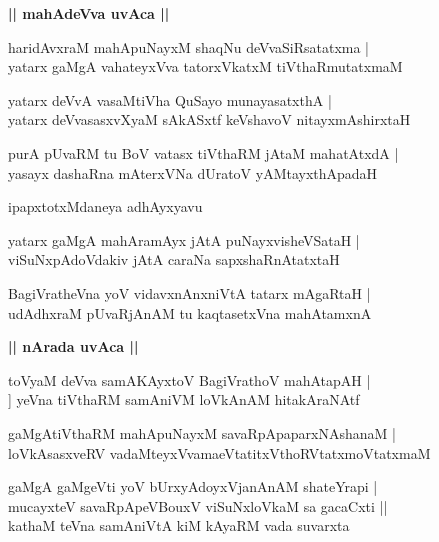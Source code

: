 \documentclass[twoside,12pt,openright]{book}
\newcounter{shloka}[chapter]
\def\uvaca#1{\centerline{{\large\textbf{#1}}}}
\begin{document}
\uvaca{|| mahAdeVva uvAca ||}

\begin{shloka}%
haridAvxraM mahApuNayxM shaqNu deVvaSiRsatatxma |\\
yatarx gaMgA vahateyxVva tatorxVkatxM tiVthaRmutatxmaM 
\end{shloka}

\begin{shloka}%
yatarx deVvA vasaMtiVha QuSayo munayasatxthA |\\
yatarx deVvasasxvXyaM sAkASxtf keVshavoV nitayxmAshirxtaH 
\end{shloka}

\begin{shloka}%
purA pUvaRM tu BoV vatasx tiVthaRM jAtaM mahatAtxdA |\\
yasayx dashaRna mAterxVNa dUratoV yAMtayxthApadaH
\end{shloka}

\begin{center}
ipapxtotxMdaneya adhAyxyavu
\end{center}

\begin{shloka}%
yatarx gaMgA mahAramAyx jAtA puNayxvisheVSataH |\\
viSuNxpAdoVdakiv jAtA caraNa sapxshaRnAtatxtaH 
\end{shloka}

\begin{shloka}%
BagiVratheVna yoV vidavxnAnxniVtA tatarx mAgaRtaH |\\
udAdhxraM pUvaRjAnAM tu kaqtasetxVna mahAtamxnA 
\end{shloka}

\uvaca{|| nArada uvAca ||}

\begin{shloka}%
toVyaM deVva samAKAyxtoV BagiVrathoV mahAtapAH |\\]
yeVna tiVthaRM samAniVM loVkAnAM hitakAraNAtf
\end{shloka}

\begin{shloka}%
gaMgAtiVthaRM mahApuNayxM savaRpApaparxNAshanaM |\\
loVkAsasxveRV vadaMteyxVvamaeVtatitxVthoRVtatxmoVtatxmaM 
\end{shloka}

\begin{shloka}%
gaMgA gaMgeVti yoV bUrxyAdoyxVjanAnAM shateYrapi |\\
mucayxteV savaRpApeVBouxV viSuNxloVkaM sa gacaCxti ||\\
kathaM teVna samAniVtA kiM kAyaRM vada suvarxta
\end{shloka}
\end{document}
